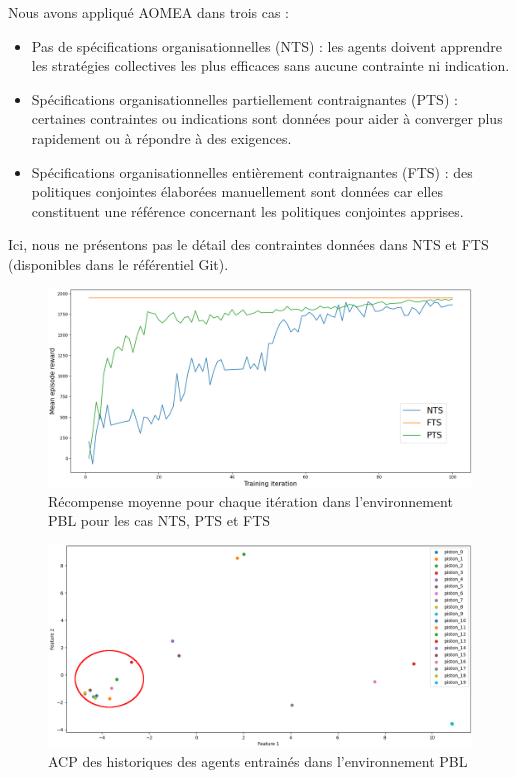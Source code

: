 \documentclass[contribution]{jfsma}
\begin{document}
Nous avons appliqué AOMEA dans trois cas :
\begin{itemize}
  \item Pas de spécifications organisationnelles (NTS) : les agents doivent apprendre les stratégies collectives les plus efficaces sans aucune contrainte ni indication.
  \item Spécifications organisationnelles partiellement contraignantes (PTS) : certaines contraintes ou indications sont données pour aider à converger plus rapidement ou à répondre à des exigences.
  \item Spécifications organisationnelles entièrement contraignantes (FTS) : des politiques conjointes élaborées manuellement sont données car elles constituent une référence concernant les politiques conjointes apprises.
\end{itemize}

Ici, nous ne présentons pas le détail des contraintes données dans NTS et FTS (disponibles dans le référentiel Git\footnotemark[1]).

\begin{figure}[h!]
  \centering
  \includegraphics[width=\linewidth]{figures/prahom_learning_curve.png}
  \caption{Récompense moyenne pour chaque itération dans l'environnement PBL pour les cas NTS, PTS et FTS}
  \label{fig:prahom_learning_curve}
\end{figure}

\begin{figure}[h!]
  \centering
  \includegraphics[width=\linewidth]{figures/prahom_pca_analysis.png}
  \caption{ACP des historiques des agents entrainés dans l'environnement PBL}
  \label{fig:prahom_pca_analysis}
\end{figure}
\end{document}
